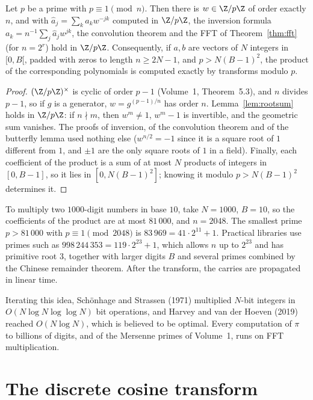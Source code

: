 \begin{theorem}\label{thm:ntt}
Let $p$ be a prime with $p\equiv1\pmod n$. Then there is $w\in\Z/p\Z$ of order exactly $n$, and with $\hat a_j=\sum_ka_kw^{-jk}$ computed in $\Z/p\Z$,
the inversion formula $a_k=n^{-1}\sum_j\hat a_jw^{jk}$, the convolution theorem and the FFT of Theorem~\ref{thm:fft} (for $n=2^r$) hold in $\Z/p\Z$.
Consequently, if $a,b$ are vectors of $N$ integers in $[0,B[$, padded with zeros to length $n\ge2N-1$, and $p>N(B-1)^2$, the product of the
corresponding polynomials is computed exactly by transforms modulo $p$.
\end{theorem}
\begin{proof}
$(\Z/p\Z)^\times$ is cyclic of order $p-1$ (Volume~1, Theorem~5.3), and $n$ divides $p-1$, so if $g$ is a generator, $w=g^{(p-1)/n}$ has order
$n$. Lemma~\ref{lem:rootsum} holds in $\Z/p\Z$: if $n\nmid m$, then $w^m\ne1$, $w^m-1$ is invertible, and the geometric sum vanishes. The
proofs of inversion, of the convolution theorem and of the butterfly lemma used nothing else ($w^{n/2}=-1$ since it is a square
root of $1$ different from $1$, and $\pm1$ are the only square roots of $1$ in a field). Finally, each coefficient of the product
is a sum of at most $N$ products of integers in $[0,B-1]$, so it lies in $[0,N(B-1)^2]$; knowing it modulo $p>N(B-1)^2$ determines it.
\end{proof}

To multiply two $1000$-digit numbers in base $10$, take $N=1000$, $B=10$, so the coefficients of the product are at most
$81\,000$, and $n=2048$. The smallest prime $p>81\,000$ with $p\equiv1\pmod{2048}$ is $83\,969=41\cdot2^{11}+1$. Practical libraries use
primes such as $998\,244\,353=119\cdot2^{23}+1$, which allows $n$ up to $2^{23}$ and has primitive root $3$, together with larger digits $B$
and several primes combined by the Chinese remainder theorem. After the transform, the carries are propagated in linear time.

\begin{remark}
Iterating this idea, Sch\"onhage and Strassen (1971) multiplied $N$-bit integers in $O(N\log N\log\log N)$ bit operations, and
Harvey and van der Hoeven (2019) reached $O(N\log N)$, which is believed to be optimal. Every computation of $\pi$ to billions of
digits, and of the Mersenne primes of Volume~1, runs on FFT multiplication.
\end{remark}

\section{The discrete cosine transform}

